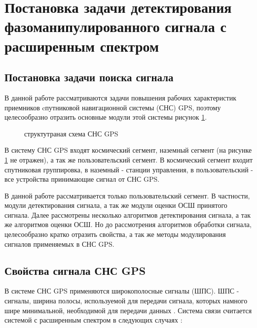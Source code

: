 \section{Постановка задачи детектирования фазоманипулированного сигнала с расширенным спектром}
\label{sec1_acq_algo}

\subsection{Постановка задачи поиска сигнала}
В данной работе рассматриваются задачи повышения рабочих характеристик приемников cпутниковой навигационной системы
(СНС) GPS, поэтому целесообразно
отразить основные модули этой системы рисунок \ref{pic:sec1_gnss_system}.
\begin{figure}[H]
\center{}
\caption{структутраная схема СНС GPS}
\label{pic:sec1_gnss_system}
\end{figure}

В систему СНС GPS входят космический сегмент, наземный сегмент (на рисунке \ref{pic:sec1_gnss_system} не
отражен), а так же пользовательский сегмент. В космический сегмент входит спутниковая группировка, в 
наземный - станции управления, в пользовательский - все устройства принимающие сигнал от СНС GPS.

В данной работе рассматривается только пользовательский сегмент. В частности, модули детектирования сигнала,
а так же модули оценки ОСШ принятого сигнала. Далее рассмотрены несколько алгоритмов детектирования сигнала,
а так же алгоритмов оценки ОСШ. Но до рассмотрения алгоритмов обработки сигнала, целесообразно кратко 
отразить свойства, а так же методы модулирования сигналов применяемых в СНС GPS.

\subsection{Свойства сигнала СНС GPS}
В системе СНС GPS применяются широкополосные сигналы (ШПС).
ШПС - сигналы, ширина полосы, используемой для передачи сигнала, которых
намного шире минимальной, необходимой для передачи данных \cite{sklyar}. Система связи считается системой с расширенным
спектром в следующих случаях \cite{sklyar}:

